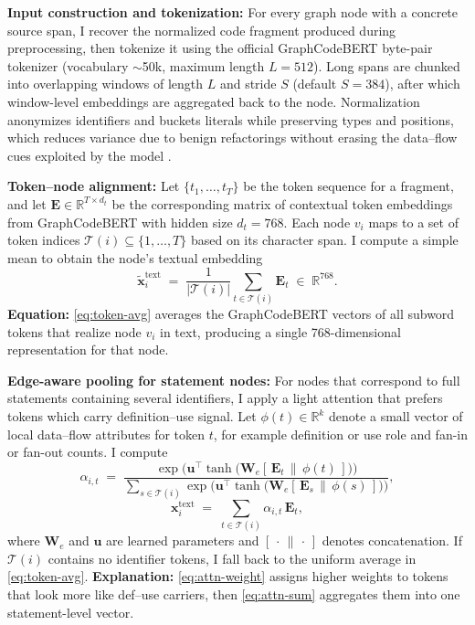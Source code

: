 \documentclass{buthesis}
\begin{document}
\textbf{Input construction and tokenization:}
For every graph node with a concrete source span, I recover the normalized code fragment produced during preprocessing, then tokenize it using the official GraphCodeBERT byte-pair tokenizer (vocabulary $\sim$50k, maximum length $L{=}512$). Long spans are chunked into overlapping windows of length $L$ and stride $S$ (default $S{=}384$), after which window-level embeddings are aggregated back to the node. Normalization anonymizes identifiers and buckets literals while preserving types and positions, which reduces variance due to benign refactorings without erasing the data–flow cues exploited by the model \cite{guo2021graphcodebert,Li2022Empirical}.

\textbf{Token–node alignment:}
Let $\{t_1,\dots,t_T\}$ be the token sequence for a fragment, and let $\mathbf{E}\in\mathbb{R}^{T\times d_t}$ be the corresponding matrix of contextual token embeddings from GraphCodeBERT with hidden size $d_t{=}768$. Each node $v_i$ maps to a set of token indices $\mathcal{T}(i)\subseteq\{1,\dots,T\}$ based on its character span. I compute a simple mean to obtain the node’s textual embedding
\begin{equation}
\label{eq:token-avg}
\tilde{\mathbf{x}}^{\text{text}}_i \;=\; \frac{1}{|\mathcal{T}(i)|} \sum_{t\in \mathcal{T}(i)} \mathbf{E}_t \;\in\; \mathbb{R}^{768}.
\end{equation}
\textbf{Equation:} \eqref{eq:token-avg} averages the GraphCodeBERT vectors of all subword tokens that realize node $v_i$ in text, producing a single 768-dimensional representation for that node.

\textbf{Edge-aware pooling for statement nodes:}
For nodes that correspond to full statements containing several identifiers, I apply a light attention that prefers tokens which carry definition–use signal. Let $\phi(t)\in\mathbb{R}^{k}$ denote a small vector of local data–flow attributes for token $t$, for example definition or use role and fan-in or fan-out counts. I compute
\begin{equation}
\label{eq:attn-weight}
\alpha_{i,t} \;=\; \frac{\exp\!\big(\mathbf{u}^\top \tanh\!\big(\mathbf{W}_e [\,\mathbf{E}_t \,\|\, \phi(t)\,]\big)\big)}{\sum_{s\in\mathcal{T}(i)} \exp\!\big(\mathbf{u}^\top \tanh\!\big(\mathbf{W}_e [\,\mathbf{E}_s \,\|\, \phi(s)\,]\big)\big)} ,
\end{equation}
\begin{equation}
\label{eq:attn-sum}
\mathbf{x}^{\text{text}}_i \;=\; \sum_{t\in\mathcal{T}(i)} \alpha_{i,t}\,\mathbf{E}_t ,
\end{equation}
where $\mathbf{W}_e$ and $\mathbf{u}$ are learned parameters and $[\,\cdot \,\|\, \cdot\,]$ denotes concatenation. If $\mathcal{T}(i)$ contains no identifier tokens, I fall back to the uniform average in \eqref{eq:token-avg}. \textbf{Explanation:} \eqref{eq:attn-weight} assigns higher weights to tokens that look more like def–use carriers, then \eqref{eq:attn-sum} aggregates them into one statement-level vector.
\end{document}
